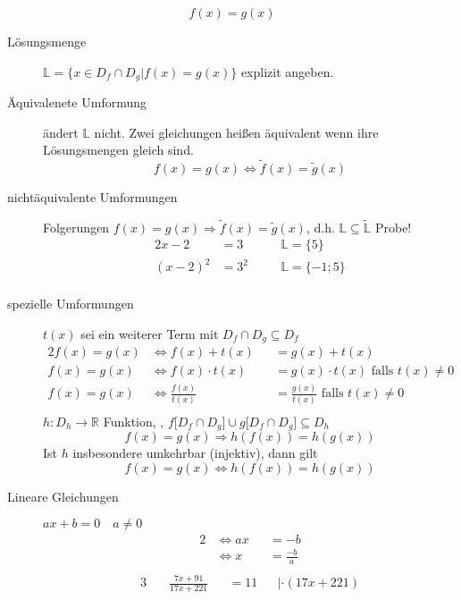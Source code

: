 \[f(x)=g(x)\]
\begin{description}
    \item[Lösungsmenge] $\mathbb{L} = \lbrace x \in D_f \cap D_g | f(x) = g(x) \rbrace$ explizit angeben.
    \item[Äquivalenete Umformung] ändert $\mathbb{L}$ nicht.
    Zwei gleichungen heißen äquivalent wenn ihre Lösungsmengen gleich sind.
    \[f(x)= g(x) \Leftrightarrow \widetilde{f}(x) = \widetilde{g}(x)\]
    \item[nichtäquivalente Umformungen]
    Folgerungen $f(x) = g(x) \Rightarrow \widetilde{f}(x) = \widetilde{g}(x)$, d.h. $\mathbb{L} \subseteq \widetilde{\mathbb{L}}$ Probe!
    \begin{alignat*}{2}
        x-2     & = 3 \quad    &  & \mathbb{L} = \lbrace 5 \rbrace     \\
        (x-2)^2 & = 3^2  \quad &  & \mathbb{L} = \lbrace -1; 5 \rbrace \\
    \end{alignat*}
    \item[spezielle Umformungen] $t(x)$ sei ein weiterer Term mit $D_f \cap D_g \subseteq D_f$
    \begin{alignat*}{2}
        f(x) = g(x) & \Leftrightarrow f(x) + t(x)       &  & = g(x) + t(x)                                     \\
        f(x) = g(x) & \Leftrightarrow f(x) \cdot t(x)   &  & = g(x) \cdot t(x)\textrm{ falls } t(x) \not = 0   \\
        f(x) = g(x) & \Leftrightarrow \frac{f(x)}{t(x)} &  & = \frac{g(x)}{t(x)}\textrm{ falls } t(x) \not = 0 \\
    \end{alignat*}
    $h : D_h \longrightarrow \mathbb{R}$ Funktion, , $f\lbrack D_f \cap D_g \rbrack \cup g\lbrack D_f \cap D_g \rbrack \subseteq D_h$
    \[f(x) = g(x) \Rightarrow h(f(x)) = h(g(x))\]
    Ist $h$ insbesondere umkehrbar (injektiv), dann gilt
    \[f(x) = g(x) \Leftrightarrow h(f(x)) = h(g(x))\]
    \item[Lineare Gleichungen] $ax + b = 0 \quad a \not = 0$
    \begin{alignat*}{2}
        & \Leftrightarrow ax &  & = -b           \\
        & \Leftrightarrow x  &  & = \frac{-b}{a} \\
    \end{alignat*}
    \begin{alignat*}{3}
        & \quad \frac{7x+91}{17x+221} &  & = 11                 &  & | \cdot (17x + 221) \\

\end{alignat*}
\end{description}
